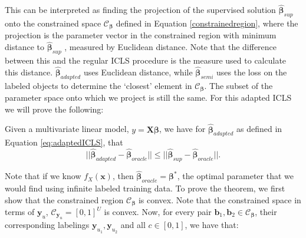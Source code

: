 \documentclass{llncs}
\newcommand{\Nunl}{U}
\begin{document}
This can be interpreted as finding the projection of the supervised solution $\boldsymbol{\hat{\beta}}_{sup}$ onto the constrained space $\mathcal{C}_{\boldsymbol{\beta}}$ defined in Equation \eqref{constrainedregion}, where the projection is the parameter vector in the constrained region with minimum distance to $\boldsymbol{\hat{\beta}}_{sup}$ , measured by Euclidean distance. Note that the difference between this and the regular ICLS procedure is the measure used to calculate this distance. $\boldsymbol{\hat{\beta}}_{adapted}$ uses Euclidean distance, while $\boldsymbol{\hat{\beta}}_{semi}$ uses the loss on the labeled objects to determine the `closest' element in $\mathcal{C}_{\boldsymbol{\beta}}$. The subset of the parameter space onto which we project is still the same. For this adapted ICLS we will prove the following:

\begin{theorem}
Given a multivariate linear model, $y = \boldsymbol{X} \boldsymbol{{\beta}}$, we have for $\boldsymbol{\hat{\beta}}_{adapted}$ as defined in Equation \eqref{eq:adaptedICLS}, that  
\begin{equation}
||\boldsymbol{\hat{\beta}}_{adapted}-\boldsymbol{\hat{\beta}}_{oracle}|| \leq ||\boldsymbol{\hat{\beta}}_{sup}-\boldsymbol{\hat{\beta}}_{oracle}||.
\end{equation}
\end{theorem}

Note that if we know $f_X(\boldsymbol{x})$, then $\boldsymbol{\hat{\beta}}_{oracle}=\boldsymbol{{\beta}}^\ast$, the optimal parameter that we would find using infinite labeled training data. To prove the theorem, we first show that the constrained region $\mathcal{C}_{\boldsymbol{\beta}}$ is convex. Note that the constrained space in terms of $\mathbf{y}_u$, $\mathcal{C}_{\mathbf{y}_u}=[0,1]^{\Nunl}$ is convex. Now, for every pair $\boldsymbol{b}_1, \boldsymbol{b}_2 \in \mathcal{C}_{\boldsymbol{\beta}}$, their corresponding labelings $\mathbf{y}_{u_1}, \mathbf{y}_{u_2}$ and all $c \in [0,1]$, we have that: 
\end{document}
